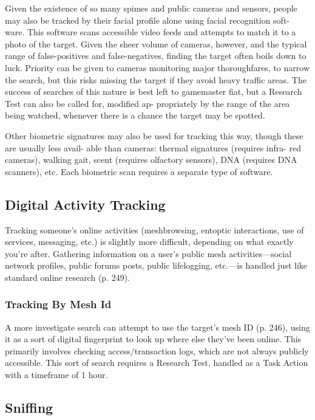 Given the existence of so many spimes and public 
cameras and sensors, people may also be tracked by 
their facial profile alone using facial recognition soft-
ware. This software scans accessible video feeds and 
attempts to match it to a photo of the target. Given 
the sheer volume of cameras, however, and the typical 
range of false-positives and false-negatives, finding 
the target often boils down to luck. Priority can be 
given to cameras monitoring major thoroughfares, to 
narrow the search, but this risks missing the target if 
they avoid heavy traffic areas. The success of searches 
of this nature is best left to gamemaster fiat, but a 
Research Test can also be called for, modified  ap-
propriately by the range of the area being watched, 
whenever there is a chance the target may be spotted.

Other biometric signatures may also be used for 
tracking this way, though these are usually less avail-
able than cameras: thermal signatures (requires infra-
red cameras), walking gait, scent (requires olfactory 
sensors), DNA (requires DNA scanners), etc. Each 
biometric scan requires a separate type of software.

\subsection{Digital Activity Tracking}

Tracking someone's online activities (meshbrowsing, 
entoptic interactions, use of services, messaging, etc.) 
is slightly more difficult, depending on what exactly 
you're after. Gathering information on a user's public 
mesh activities—social network profiles, public 
forums posts, public lifelogging, etc.—is handled just 
like standard online research (p. 249).

\subsubsection{Tracking By Mesh Id}

A more investigate search can attempt to use the 
target's mesh ID (p. 246), using it as a sort of digital 
fingerprint to look up where else they've been online. 
This primarily involves checking access/transaction 
logs, which are not always publicly accessible. This 
sort of search requires a Research Test, handled as a 
Task Action with a timeframe of 1 hour.

\subsection{Sniffing}

